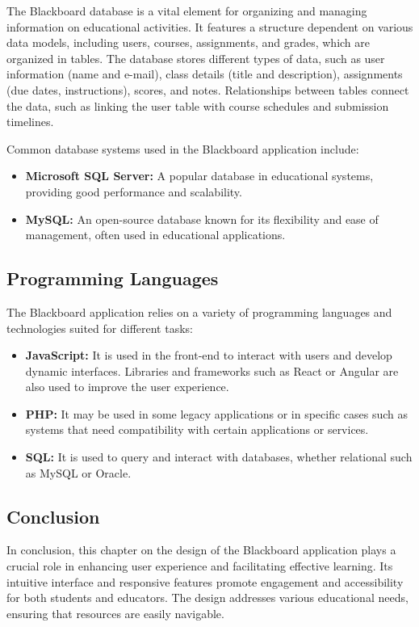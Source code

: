 \documentclass[a4paper,12pt]{article}
\begin{document}
The Blackboard database is a vital element for organizing and managing information on educational activities. It features a structure dependent on various data models, including users, courses, assignments, and grades, which are organized in tables. The database stores different types of data, such as user information (name and e-mail), class details (title and description), assignments (due dates, instructions), scores, and notes. Relationships between tables connect the data, such as linking the user table with course schedules and submission timelines.

Common database systems used in the Blackboard application include:
\begin{itemize}
    \item \textbf{Microsoft SQL Server:} A popular database in educational systems, providing good performance and scalability.
    \item \textbf{MySQL:} An open-source database known for its flexibility and ease of management, often used in educational applications.
\end{itemize}

\subsection{Programming Languages}

The Blackboard application relies on a variety of programming languages and technologies suited for different tasks:
\begin{itemize}
    \item \textbf{JavaScript:} It is used in the front-end to interact with users and develop dynamic
interfaces. Libraries and frameworks such as React or Angular are also used to
improve the user experience. 
    \item \textbf{PHP:} It may be used in some legacy applications or in specific cases such as
systems that need compatibility with certain applications or services. 
    \item \textbf{SQL:} It is used to query and interact with databases, whether relational such as
MySQL or Oracle.
\end{itemize}

\subsection{Conclusion}

In conclusion, this chapter on the design of the Blackboard application plays a
crucial role in enhancing user experience and facilitating effective learning. Its
intuitive interface and responsive features promote engagement and accessibility for
both students and educators. The design addresses various educational needs,
ensuring that resources are easily navigable.
\end{document}
